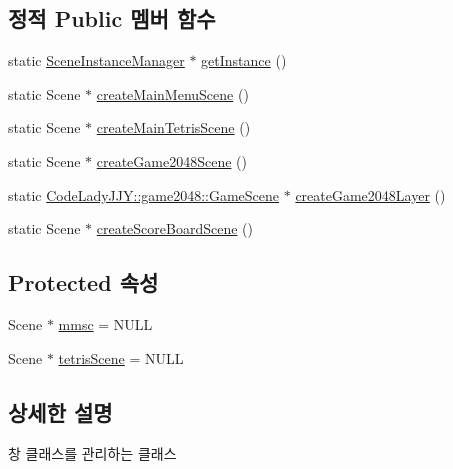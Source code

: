 \subsection*{정적 Public 멤버 함수}
\begin{DoxyCompactItemize}
\item 
static \hyperlink{class_tetris_1_1_cocos2d_scenes_1_1_scene_instance_manager}{Scene\+Instance\+Manager} $\ast$ \hyperlink{class_tetris_1_1_cocos2d_scenes_1_1_scene_instance_manager_a0010e1efc6470cde661494631dc35b90}{get\+Instance} ()
\item 
static Scene $\ast$ \hyperlink{class_tetris_1_1_cocos2d_scenes_1_1_scene_instance_manager_a7dad1373db969d5c882e2cdc46f7933a}{create\+Main\+Menu\+Scene} ()
\item 
static Scene $\ast$ \hyperlink{class_tetris_1_1_cocos2d_scenes_1_1_scene_instance_manager_a536188c1cdb7cb46ebd2edc8ebf1f17a}{create\+Main\+Tetris\+Scene} ()
\item 
static Scene $\ast$ \hyperlink{class_tetris_1_1_cocos2d_scenes_1_1_scene_instance_manager_a271e373f7a835b2e8dcec0a69be4f849}{create\+Game2048\+Scene} ()
\item 
static \hyperlink{class_code_lady_j_j_y_1_1game2048_1_1_game_scene}{Code\+Lady\+J\+J\+Y\+::game2048\+::\+Game\+Scene} $\ast$ \hyperlink{class_tetris_1_1_cocos2d_scenes_1_1_scene_instance_manager_abf51bf93d8d00d660c18b9e690fdee1a}{create\+Game2048\+Layer} ()
\item 
static Scene $\ast$ \hyperlink{class_tetris_1_1_cocos2d_scenes_1_1_scene_instance_manager_a159ac191291a7cc3575d6f5790df6646}{create\+Score\+Board\+Scene} ()
\end{DoxyCompactItemize}
\subsection*{Protected 속성}
\begin{DoxyCompactItemize}
\item 
Scene $\ast$ \hyperlink{class_tetris_1_1_cocos2d_scenes_1_1_scene_instance_manager_aed6486f09ebd0506636943d3355de167}{mmsc} = N\+U\+LL
\item 
Scene $\ast$ \hyperlink{class_tetris_1_1_cocos2d_scenes_1_1_scene_instance_manager_a7952a2c89cda55aba40056a7c9236ded}{tetris\+Scene} = N\+U\+LL
\end{DoxyCompactItemize}


\subsection{상세한 설명}
창 클래스를 관리하는 클래스 

